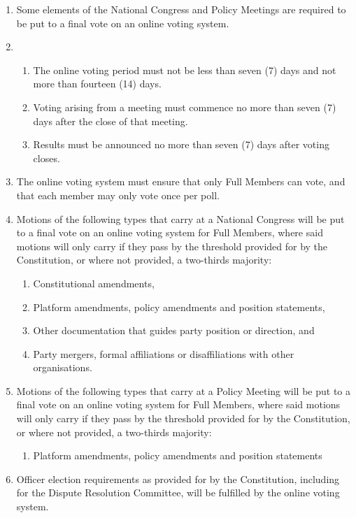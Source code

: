 \documentclass[a4paper,titlepage,8.5pt]{article}
\begin{document}
\begin{enumerate}
\item Some elements of the National Congress and Policy Meetings are required to be put to a final vote on an online voting system.
\item 
\begin{enumerate}
\item The online voting period must not be less than seven (7) days and not more than fourteen (14) days.
\item Voting arising from a meeting must commence no more than seven (7) days after the close of that meeting.
\item Results must be announced no more than seven (7) days after voting closes.
\end{enumerate}
\item The online voting system must ensure that only Full Members can vote, and that each member may only vote once per poll.
\item Motions of the following types that carry at a National Congress will be put to a final vote on an online voting system for Full Members, where said motions will only carry if they pass by the threshold provided for by the Constitution, or where not provided, a two-thirds majority:
\begin{enumerate}
\item Constitutional amendments,
\item Platform amendments, policy amendments and position statements,
\item Other documentation that guides party position or direction, and
\item Party mergers, formal affiliations or disaffiliations with other organisations.
\end{enumerate}
\item Motions of the following types that carry at a Policy Meeting will be put to a final vote on an online voting system for Full Members, where said motions will only carry if they pass by the threshold provided for by the Constitution, or where not provided, a two-thirds majority:
\begin{enumerate}
\item Platform amendments, policy amendments and position statements
\end{enumerate}
\item Officer election requirements as provided for by the Constitution, including for the Dispute Resolution Committee, will be fulfilled by the online voting system.
\end{enumerate}
\end{document}
